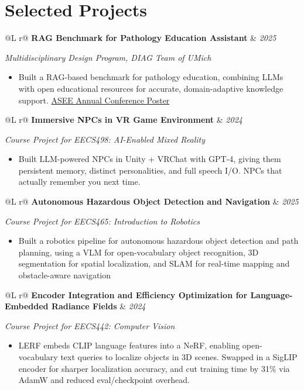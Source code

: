 \documentclass[11pt,a4paper]{article}
\makeatletter
\newcommand{\cventry}[3]{%
  \vspace{4pt}
  \noindent\begin{tabularx}{\linewidth}{@{}L r@{}}
    #1 & \textit{#2}
  \end{tabularx}\par
  #3
  \vspace{4pt}
}
\makeatother
\begin{document}
\section{Selected Projects}
\cventry{\textbf{RAG Benchmark for Pathology Education Assistant}}{2025}{%
\textit{Multidisciplinary Design Program, DIAG Team of UMich}\par
\begin{itemize}
\item Built a RAG-based benchmark for pathology education, combining LLMs with open educational resources for accurate, domain-adaptive knowledge support. \href{https://peer.asee.org/board-92-wip-generative-ai-based-learning-tutor-for-biomedical-data-science-gail-tutor-bds}{ASEE Annual Conference Poster}
\end{itemize}
}
\cventry{\textbf{Immersive NPCs in VR Game Environment}}{2024}{%
\textit{Course Project for EECS498: AI-Enabled Mixed Reality}\par
\begin{itemize}
\item Built LLM-powered NPCs in Unity + VRChat with GPT-4, giving them persistent memory, distinct personalities, and full speech I/O. NPCs that actually remember you next time.
\end{itemize}
}
\cventry{\textbf{Autonomous Hazardous Object Detection and Navigation}}{2025}{%
\textit{Course Project for EECS465: Introduction to Robotics}\par
\begin{itemize}
\item Built a robotics pipeline for autonomous hazardous object detection and path planning, using a VLM for open-vocabulary object recognition, 3D segmentation for spatial localization, and SLAM for real-time mapping and obstacle-aware navigation
\end{itemize}
}
\cventry{\textbf{Encoder Integration and Efficiency Optimization for Language-Embedded Radiance Fields}}{2024}{%
\textit{Course Project for EECS442: Computer Vision}\par
\begin{itemize}
\item LERF embeds CLIP language features into a NeRF, enabling open-vocabulary text queries to localize objects in 3D scenes. Swapped in a SigLIP encoder for sharper localization accuracy, and cut training time by 31\% via AdamW and reduced eval/checkpoint overhead.
\end{itemize}
}

\end{document}
